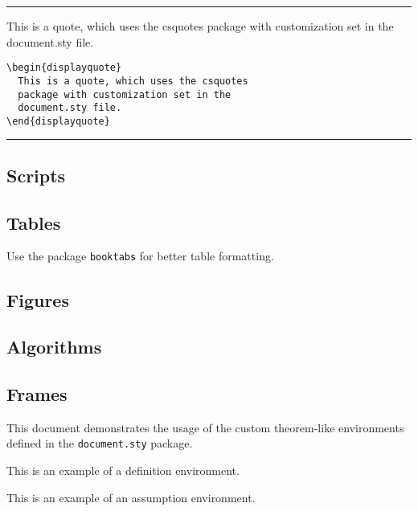 \noindent\rule{\linewidth}{0.4pt}

\begin{multicols}{2}
  \begin{displayquote}
    This is a quote, which uses the csquotes 
    package with customization set in the 
    document.sty file.
  \end{displayquote}
  \columnbreak
  \begin{verbatim}
\begin{displayquote}
  This is a quote, which uses the csquotes 
  package with customization set in the 
  document.sty file.
\end{displayquote}
  \end{verbatim}
\end{multicols}

\noindent\rule{\linewidth}{0.4pt}

\subsection{Scripts}

\subsection{Tables}
Use the package \texttt{booktabs} for better table formatting.

\subsection{Figures}

\subsection{Algorithms}

\subsection{Frames}

This document demonstrates the usage of the custom theorem-like environments defined in the \texttt{document.sty} package.

\begin{definition}
  This is an example of a definition environment.
\end{definition}

\begin{assumption}
  This is an example of an assumption environment.
\end{assumption}

